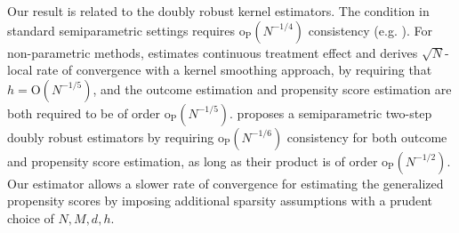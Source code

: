 \documentclass[11pt]{article}
\begin{document}
Our result is related to the doubly robust kernel estimators. The condition in standard semiparametric settings requires $\mathrm{o}_{\mathrm{P}}(N^{-1/4})$ consistency (e.g. \citep{chernozhukov2017double}). For non-parametric methods, \citet{kennedy2017non} estimates continuous treatment effect and derives $\sqrt{N}$-local rate of convergence with a kernel smoothing approach, by requiring that $h=\mathrm{O}(N^{-1/5})$, and the outcome estimation and propensity score estimation are both required to be of order $\mathrm{o}_{\mathrm{P}}(N^{-1/5})$. \citet{rothe2019properties} proposes a semiparametric two-step doubly robust estimators by requiring $\mathrm{o}_{\mathrm{P}}(N^{-1/6})$ consistency for both outcome and propensity score estimation, as long as their product is of order $\mathrm{o}_{\mathrm{P}}(N^{-1/2})$. 
Our estimator allows a slower rate of convergence for estimating the generalized propensity scores by imposing additional sparsity assumptions with a prudent choice of $N,M,d,h$. 
\end{document}
